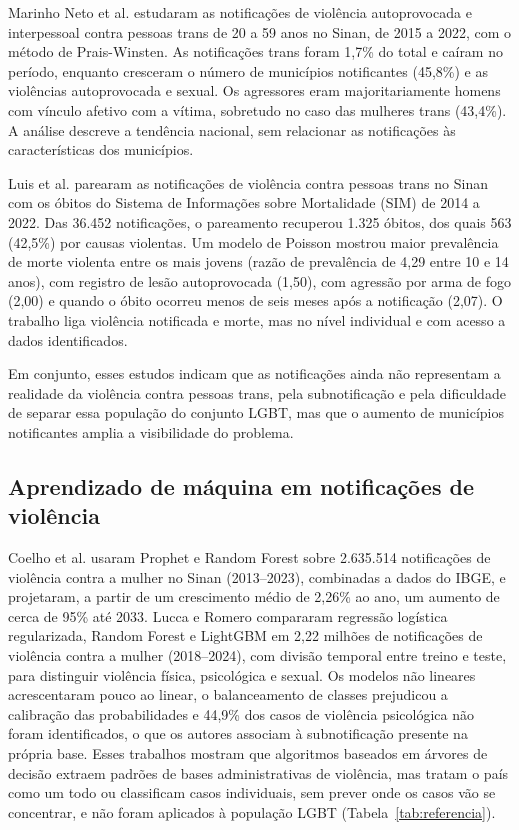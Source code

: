 \documentclass[12pt]{article}
\begin{document}
Marinho Neto et al. \cite{marinho_tomazelli_firianelli:2024} estudaram as notificações de violência autoprovocada e interpessoal contra pessoas trans de 20 a 59 anos no Sinan, de 2015 a 2022, com o método de Prais-Winsten. As notificações trans foram 1,7\% do total e caíram no período, enquanto cresceram o número de municípios notificantes (45,8\%) e as violências autoprovocada e sexual. Os agressores eram majoritariamente homens com vínculo afetivo com a vítima, sobretudo no caso das mulheres trans (43,4\%). A análise descreve a tendência nacional, sem relacionar as notificações às características dos municípios.

Luis et al. \cite{luis:2025} parearam as notificações de violência contra pessoas trans no Sinan com os óbitos do Sistema de Informações sobre Mortalidade (SIM) de 2014 a 2022. Das 36.452 notificações, o pareamento recuperou 1.325 óbitos, dos quais 563 (42,5\%) por causas violentas. Um modelo de Poisson mostrou maior prevalência de morte violenta entre os mais jovens (razão de prevalência de 4,29 entre 10 e 14 anos), com registro de lesão autoprovocada (1,50), com agressão por arma de fogo (2,00) e quando o óbito ocorreu menos de seis meses após a notificação (2,07). O trabalho liga violência notificada e morte, mas no nível individual e com acesso a dados identificados.

Em conjunto, esses estudos indicam que as notificações ainda não representam a realidade da violência contra pessoas trans, pela subnotificação e pela dificuldade de separar essa população do conjunto LGBT, mas que o aumento de municípios notificantes amplia a visibilidade do problema.

\subsection{Aprendizado de máquina em notificações de violência}

Coelho et al. \cite{coelho_jiv:2025} usaram Prophet e Random Forest sobre 2.635.514 notificações de violência contra a mulher no Sinan (2013--2023), combinadas a dados do IBGE, e projetaram, a partir de um crescimento médio de 2,26\% ao ano, um aumento de cerca de 95\% até 2033. Lucca e Romero \cite{lucca_romero_sbbd:2026} compararam regressão logística regularizada, Random Forest e LightGBM em 2,22 milhões de notificações de violência contra a mulher (2018--2024), com divisão temporal entre treino e teste, para distinguir violência física, psicológica e sexual. Os modelos não lineares acrescentaram pouco ao linear, o balanceamento de classes prejudicou a calibração das probabilidades e 44,9\% dos casos de violência psicológica não foram identificados, o que os autores associam à subnotificação presente na própria base. Esses trabalhos mostram que algoritmos baseados em árvores de decisão extraem padrões de bases administrativas de violência, mas tratam o país como um todo ou classificam casos individuais, sem prever onde os casos vão se concentrar, e não foram aplicados à população LGBT (Tabela~\ref{tab:referencia}).
\end{document}
